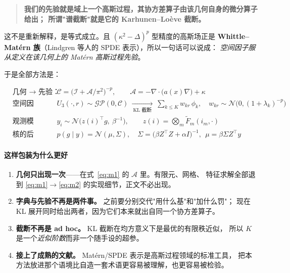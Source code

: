 \documentclass[11pt,a4paper]{article}
\begin{document}
\begin{quote}
\textbf{我们的先验就是域上一个高斯过程，其协方差算子由该几何自身的微分算子给出；
所谓"谱截断"就是它的 Karhunen--Loève 截断。}
\end{quote}

这不是重新解释，是等式成立。且 $(\kappa^2-\Delta)^{p}$ 型精度的高斯场正是
\textbf{Whittle--Matérn 族}（Lindgren 等人的 SPDE 表示），所以一句话可以说成：
\emph{空间因子服从定义在该几何上的 Matérn 高斯过程先验}。

于是全部方法是：

\begin{align}
&\textbf{几何 $\to$ 先验：}
&&\mathcal C=\big(\mathcal I+\mathcal A/\pi^2\big)^{-p},
\qquad \mathcal A=-\nabla\!\cdot\!\big(a(x)\nabla\big)+\kappa
\label{eq:m1}\\[4pt]
&\textbf{空间因子：}
&&U_3(\cdot,r)\sim\mathcal{GP}(0,\mathcal C)
\ \xrightarrow[\ \text{KL 截断}\ ]{}\
\sum_{k\le K}w_{kr}\,\phi_k,\quad
w_{kr}\sim\mathcal N\big(0,(1+\lambda_k)^{-p}\big)
\label{eq:m2}\\[4pt]
&\textbf{观测模型：}
&&y_i\sim\mathcal N\big(z(i)^\top g,\ \beta^{-1}\big),
\qquad z(i)=\bigotimes_{m}\tilde F_m(i_m,\cdot)
\label{eq:m3}\\[4pt]
&\textbf{核的后验：}
&&p(g\mid y)=\mathcal N(\mu,\Sigma),\quad
\Sigma=\big(\beta Z^\top Z+\alpha I\big)^{-1},\ \
\mu=\beta\Sigma Z^\top y
\label{eq:m4}
\end{align}

\paragraph{这样包装为什么更好}
\begin{enumerate}
\item \textbf{几何只出现一次}——在式~\eqref{eq:m1} 的 $\mathcal A$ 里。有限元、网格、
特征求解全部退到 \eqref{eq:m1}$\to$\eqref{eq:m2} 的实现细节，正文不必出现。
\item \textbf{字典与先验不再是两件事。} 之前要分别交代"用什么基"和"加什么罚"；
现在 KL 展开同时给出两者，因为它们本来就出自同一个协方差算子。
\item \textbf{截断不再是 ad hoc。} KL 截断在均方意义下是最优的有限秩近似，
所以 $K$ 是一个\emph{近似阶数}而非一个随手设的超参。
\item \textbf{接上了成熟的文献。} Matérn/SPDE 表示是高斯过程领域的标准工具，
把本方法放进那个语境比自造一套术语更容易被理解，也更容易被检验。
\end{enumerate}
\end{document}
